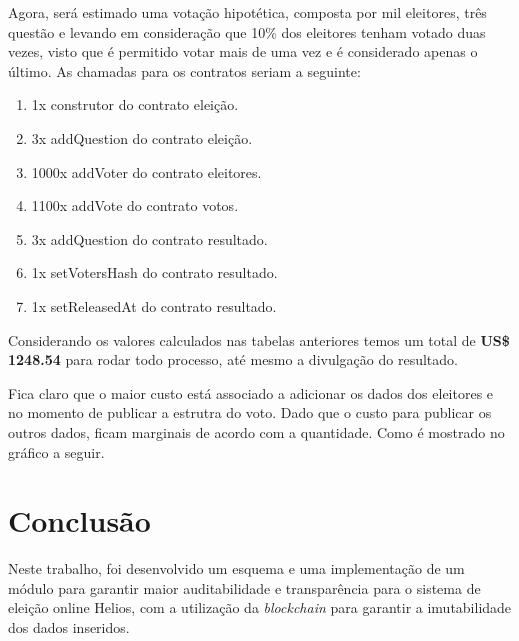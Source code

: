 \documentclass{ufsctex/ufsctex}
\begin{document}
Agora, será estimado uma votação hipotética, composta por mil eleitores, três
questão e levando em consideração que 10\% dos eleitores tenham votado duas
vezes, visto que é permitido votar mais de uma vez e é considerado apenas o
último. As chamadas para os contratos seriam a seguinte:

\begin{enumerate}
	\item 1x construtor do contrato eleição.
	\item 3x addQuestion do contrato eleição.
	\item 1000x addVoter do contrato eleitores.
	\item 1100x addVote do contrato votos.
	\item 3x addQuestion do contrato resultado.
	\item 1x setVotersHash do contrato resultado.
	\item 1x setReleasedAt do contrato resultado.
\end{enumerate}

Considerando os valores calculados nas tabelas anteriores temos um total de
\textbf{US\$ 1248.54} para rodar todo processo, até mesmo a divulgação do
resultado.

Fica claro que o maior custo está associado a adicionar os dados dos eleitores
e no momento de publicar a estrutra do voto. Dado que o custo para publicar os
outros dados, ficam marginais de acordo com a quantidade. Como é mostrado no
gráfico a seguir.


\chapter{Conclusão}
Neste trabalho, foi desenvolvido um esquema e uma implementação de um módulo
para garantir maior auditabilidade e transparência para o sistema de eleição
online Helios, com a utilização da \textit{blockchain} para garantir a
imutabilidade dos dados inseridos. 
\end{document}
